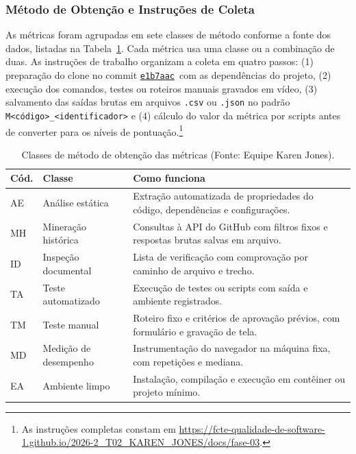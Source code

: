 \documentclass[12pt]{article}
\newcommand{\commitref}{\href{https://github.com/excalidraw/excalidraw/commit/e1b7aacb356a492aa1e0fc6eb57b8896124027f0}{\texttt{e1b7aac}}}
\renewcommand{\arraystretch}{0.9}
\begin{document}
\subsubsection{Método de Obtenção e Instruções de Coleta}
\label{subsubsec:metodo}

As métricas foram agrupadas em sete classes de método conforme a fonte dos dados, listadas na Tabela~\ref{tab:classes-metodo}. Cada métrica usa uma classe ou a combinação de duas. As instruções de trabalho organizam a coleta em quatro passos: (1) preparação do clone no commit \commitref\ com as dependências do projeto, (2) execução dos comandos, testes ou roteiros manuais gravados em vídeo, (3) salvamento das saídas brutas em arquivos \texttt{.csv} ou \texttt{.json} no padrão \texttt{M<código>\_<identificador>} e (4) cálculo do valor da métrica por scripts antes de converter para os níveis de pontuação.\footnote{As instruções completas constam em \url{https://fcte-qualidade-de-software-1.github.io/2026-2_T02_KAREN_JONES/docs/fase-03}.}

\begin{table}[!ht]
\centering
\caption{Classes de método de obtenção das métricas (Fonte: Equipe Karen Jones).}
\label{tab:classes-metodo}
\vspace{2pt}
\scriptsize
\setlength{\tabcolsep}{3pt}
\renewcommand{\arraystretch}{0.88}
\begin{tabular}{p{0.5cm}p{2.3cm}p{11.6cm}}
\toprule
\textbf{Cód.} & \textbf{Classe} & \textbf{Como funciona} \\
\midrule
AE & Análise estática    & Extração automatizada de propriedades do código, dependências e configurações. \\
MH & Mineração histórica & Consultas à API do GitHub com filtros fixos e respostas brutas salvas em arquivo. \\
ID & Inspeção documental & Lista de verificação com comprovação por caminho de arquivo e trecho. \\
TA & Teste automatizado  & Execução de testes ou scripts com saída e ambiente registrados. \\
TM & Teste manual        & Roteiro fixo e critérios de aprovação prévios, com formulário e gravação de tela. \\
MD & Medição de desempenho & Instrumentação do navegador na máquina fixa, com repetições e mediana. \\
EA & Ambiente limpo      & Instalação, compilação e execução em contêiner ou projeto mínimo. \\
\bottomrule
\end{tabular}
\end{table}
\end{document}
